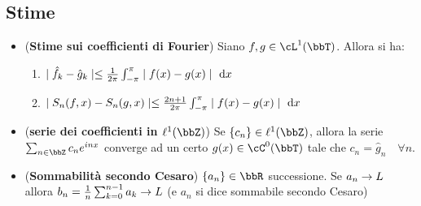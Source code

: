 \documentclass[a4paper,NoNotes,GeneralMath]{stdmdoc}
\newcommand{\intpie}{\int_{-\pi}^\pi }
\newcommand{\fractopie}{\frac{1}{2\pi}}
\newcommand{\CT}[1]{\cC^{#1}(\bbT)}
\newcommand{\LT}[1]{\cL^{#1}(\bbT)}
\newcommand{\cl}{\ell}
\begin{document}
        \subsection*{Stime}
        \begin{itemize}
        \item ({\bf Stime sui coefficienti di Fourier}) Siano $f, g \in \LT{1}$. Allora si ha:
          \begin{enumerate}
          \item $\abs{\hat{f}_k - \hat{g}_k} \le \fractopie \intpie \abs{f(x) - g(x)} \de x$
          \item $\abs{S_n(f, x) - S_n(g, x)} \le \frac{2n+1}{2\pi} \intpie \abs{f(x) - g(x)} \de x$
          \end{enumerate}
        \item ({\bf serie dei coefficienti in $\cl^1(\bbZ)$}) Se $\{c_n\} \in \cl^1(\bbZ)$, allora la serie $\sum_{n \in \bbZ} c_n e^{inx}$ converge ad un certo $g(x) \in \CT{0}$ tale che $c_n = \hat{g}_n \quad \forall n$.
          \item ({\bf Sommabilità secondo Cesaro}) $\{a_n\} \in \bbR$ successione. Se $a_n \rightarrow L$ allora $b_n = \frac{1}{n} \sum_{k=0}^{n-1} a_k \rightarrow L$ (e $a_n$ si dice sommabile secondo Cesaro)
        \end{itemize}
\end{document}
